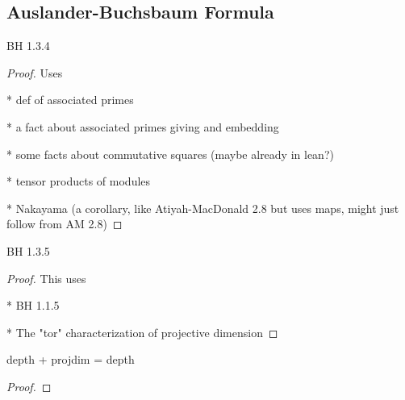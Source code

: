 \subsection{Auslander-Buchsbaum Formula}

\begin{lemma}
  \label{lem:module_assoc_maximal_tensor_free_summand}
  BH 1.3.4
\end{lemma}

\begin{proof}
  Uses

  * def of associated primes

  * a fact about associated primes giving and embedding

  * some facts about commutative squares (maybe already in lean?)

  * tensor products of modules

  * Nakayama (a corollary, like Atiyah-MacDonald 2.8 
    but uses maps, might just follow from AM 2.8)
\end{proof}

\begin{lemma}
  \label{lem:projdim_preserved_quotient_reg_elt}
  BH 1.3.5
\end{lemma}

\begin{proof}
  This uses 

  * BH 1.1.5

  * The "tor" characterization of projective dimension

\end{proof}

\begin{theorem}
  \label{thm:auslander_buchsbaum_formula}
  depth + projdim = depth
\end{theorem}

\begin{proof}
\end{proof}



